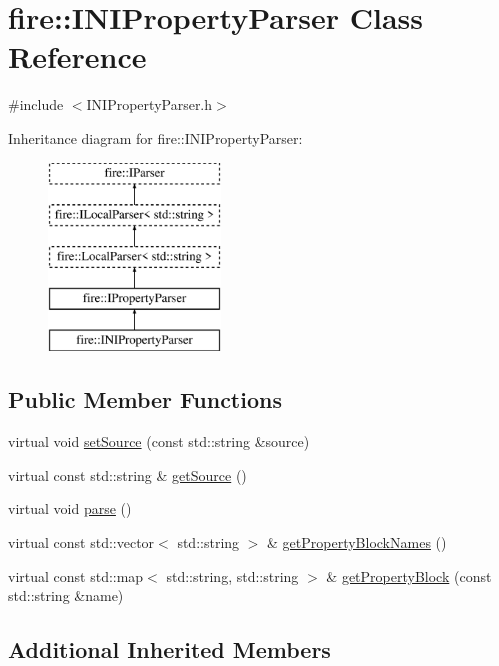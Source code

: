 \hypertarget{a00157}{}\section{fire\+:\+:I\+N\+I\+Property\+Parser Class Reference}
\label{a00157}


{\ttfamily \#include $<$I\+N\+I\+Property\+Parser.\+h$>$}

Inheritance diagram for fire\+:\+:I\+N\+I\+Property\+Parser\+:\begin{figure}[H]
\begin{center}
\leavevmode
\includegraphics[height=5.000000cm]{a00157}
\end{center}
\end{figure}
\subsection*{Public Member Functions}
\begin{DoxyCompactItemize}
\item 
virtual void \hyperlink{a00157_a06793909bc707a69d0c5772b14bc946d}{set\+Source} (const std\+::string \&source)
\item 
virtual const std\+::string \& \hyperlink{a00157_ad02c9a530f20a706d7bb2554813e8d3a}{get\+Source} ()
\item 
virtual void \hyperlink{a00157_a31b6bad01e65ed4bb5f1ba297616c641}{parse} ()
\item 
virtual const std\+::vector$<$ std\+::string $>$ \& \hyperlink{a00157_aed0f1f47111794659564dcddb4d25bc6}{get\+Property\+Block\+Names} ()
\item 
virtual const std\+::map$<$ std\+::string, std\+::string $>$ \& \hyperlink{a00157_a3591312590a66659ebd377cdde9ab9ad}{get\+Property\+Block} (const std\+::string \&name)
\end{DoxyCompactItemize}
\subsection*{Additional Inherited Members}


